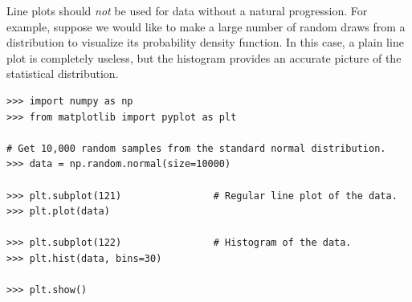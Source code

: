 Line plots should \emph{not} be used for data without a natural progression.
For example, suppose we would like to make a large number of random draws from a distribution to visualize its probability density function.
In this case, a plain line plot is completely useless, but the histogram provides an accurate picture of the statistical distribution.

\begin{lstlisting}
>>> import numpy as np
>>> from matplotlib import pyplot as plt

# Get 10,000 random samples from the standard normal distribution.
>>> data = np.random.normal(size=10000)

>>> plt.subplot(121)                # Regular line plot of the data.
>>> plt.plot(data)

>>> plt.subplot(122)                # Histogram of the data.
>>> plt.hist(data, bins=30)

>>> plt.show()
\end{lstlisting}

